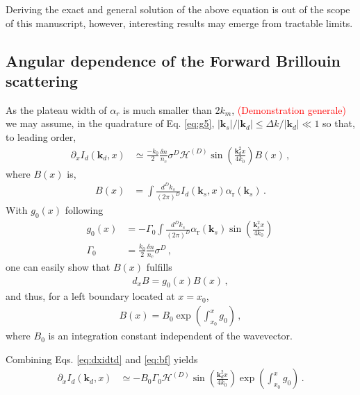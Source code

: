 \documentclass[
 reprint,
 amsmath,amssymb,
 aps,
]{revtex4-1}
\begin{document}
\begin{widetext}
 \end{widetext}
Deriving the exact and general solution of the above equation is out of the scope of this manuscript, however, interesting results may emerge from tractable limits. 

 \subsection{Angular dependence of the  Forward Brillouin scattering}\label{sec:sp}
As the plateau width of $\alpha_r$ is much smaller than $2k_m$, \textcolor{red}{(Demonstration generale)}  we may assume, in the quadrature of Eq. \eqref{eq:g5},   $ \vert\mathbf{k}_s \vert/\vert\mathbf{k}_d\vert \le\Delta k/ \vert\mathbf{k}_d\vert \ll 1$ so that, to leading order,
\begin{align}
\partial_xI_d(\mathbf{k}_d,x)&\simeq  \frac{-k_0}{2} \frac{ \delta n}{n_c}   \sigma^D 
 \mathcal{H}^{(D)}\sin\left({\frac{ \mathbf{k}_d^2x}{4k_0}}  \right)
B(x)
\, , \label{eq:dxidtd}
\end{align}
where $B(x)$ is,
\begin{align}
B(x)&=
 \int \frac{d^Dk_s}{(2\pi)^D}    I_d(\mathbf{k}_s,x) \alpha_\mathrm{r}(\mathbf{k}_s) 
\, . \label{eq:b}
\end{align}
With $g_0(x)$ following
\begin{align}
g_0(x)&= -\Gamma_0 \int \frac{d^Dk_s}{(2\pi)^D}  \alpha_\mathrm{r}(\mathbf{k}_s) 
\sin\left(\frac{ \mathbf{k}_s^2x}{4k_0}  \right)\,  \nonumber\\
\Gamma_0&=\frac{k_0}{2}  \frac{\delta n}{n_c}
  \sigma^D \, ,
\label{eq:gain0}
\end{align}
one can easily show that $B(x)$ fulfills 
\begin{align}
d_xB = g_0(x) B(x)\, ,
\label{eq:db}
\end{align} 
and thus, for a left boundary located at $x=x_0$,
\begin{align}
B(x) = B_0\exp\left(\int_{x_0}^x g_0 \right)\, ,
\label{eq:bf}
\end{align} 
where $B_0$ is an integration constant independent of the wavevector.

Combining Eqs.  \eqref{eq:dxidtd} and \eqref{eq:bf} yields 
\begin{align}
\partial_xI_d(\mathbf{k}_d,x)&\simeq -B_0\Gamma_0
 \mathcal{H}^{(D)}\sin\left({\frac{ \mathbf{k}_d^2x}{4k_0}}  \right)
\exp\left(\int_{x_0}^x g_0 \right)
\, . \label{eq:dxidtdf}
\end{align}
\end{document}
